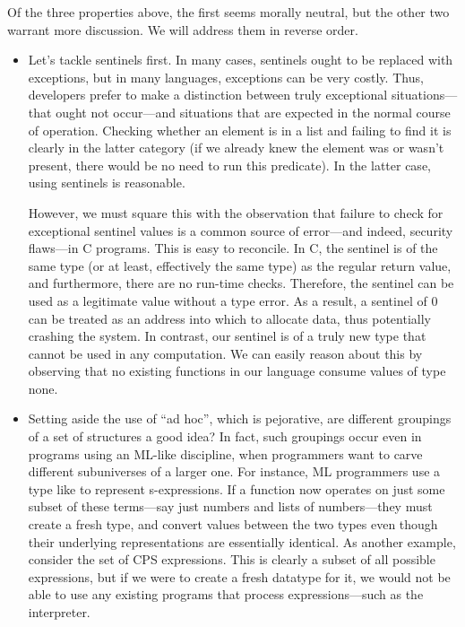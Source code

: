 Of the three properties above, the first seems morally neutral, but the other
two warrant more discussion. We will address them in reverse order.
\begin{itemize}
  \item 
Let’s tackle sentinels first. In many cases, sentinels ought to be replaced with
exceptions, but in many languages, exceptions can be very costly. Thus,
developers prefer to make a distinction between truly exceptional
situations—that ought not occur—and situations that are expected in the normal
course of operation. Checking whether an element is in a list and failing to
find it is clearly in the latter category (if we already knew the element was or
wasn’t present, there would be no need to run this predicate). In the latter
case, using sentinels is reasonable.

However, we must square this with the observation that failure to check for
exceptional sentinel values is a common source of error—and indeed, security
flaws—in C programs. This is easy to reconcile. In C, the sentinel is of the
same type (or at least, effectively the same type) as the regular return value,
and furthermore, there are no run-time checks. Therefore, the sentinel can be
used as a legitimate value without a type error. As a result, a sentinel of 0
can be treated as an address into which to allocate data, thus potentially
crashing the system. In contrast, our sentinel is of a truly new type that
cannot be used in any computation. We can easily reason about this by observing
that no existing functions in our language consume values of type none.

  \item 
Setting aside the use of “ad hoc”, which is pejorative, are different groupings
of a set of structures a good idea? In fact, such groupings occur even in
programs using an ML-like discipline, when programmers want to carve different
subuniverses of a larger one. For instance, ML programmers use a type like
to represent s-expressions. If a function now operates on just some subset of
these terms—say just numbers and lists of numbers—they must create a fresh type,
and convert values between the two types even though their underlying
representations are essentially identical. As another example, consider the set
of CPS expressions. This is clearly a subset of all possible expressions, but if
we were to create a fresh datatype for it, we would not be able to use any
existing programs that process expressions—such as the interpreter.

\end{itemize}

